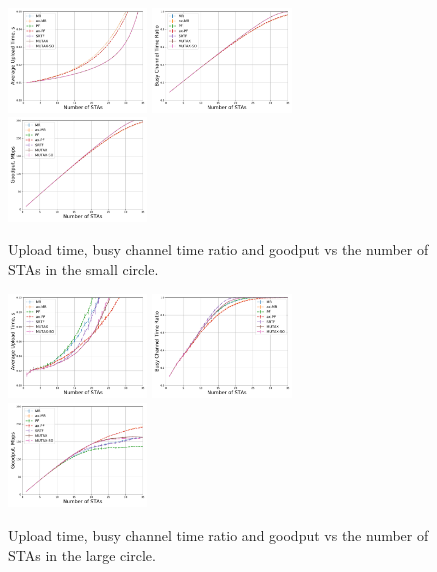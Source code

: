 \begin{figure}[tb]
	\centering
	\includegraphics[width = 0.329\textwidth]{5-d.pdf}
	\includegraphics[width = 0.329\textwidth]{5-e.pdf}
	\includegraphics[width = 0.329\textwidth]{5-t.pdf}
	\caption{\label{fig:10metres}  Upload time, busy channel time ratio and goodput vs the number of STAs in the small circle.}
\end{figure}

\begin{figure}[bt]
	\centering
	\includegraphics[width = 0.329\textwidth]{20-d.pdf}
	\includegraphics[width = 0.329\textwidth]{20-e.pdf}
	\includegraphics[width = 0.329\textwidth]{20-t.pdf}
	\caption{\label{fig:20metres} Upload time, busy channel time ratio and goodput vs the number of STAs in the large circle.}
\end{figure}

